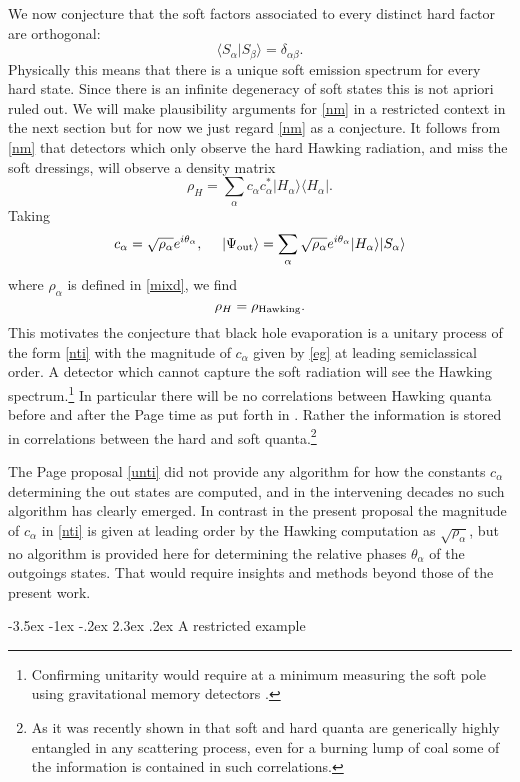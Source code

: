 \documentclass[12pt]{article}
\makeatletter
\numberwithin{equation}{section}
\def\<{\langle }
\def\>{\rangle }
\newcommand{\be}{\begin{equation}}
\newcommand{\ee}{\end{equation}}
\renewcommand\section{\@startsection {section}{1}{\z@}%
                                   {-3.5ex \@plus -1ex \@minus -.2ex}%
                                   {2.3ex \@plus.2ex}%
                                   {\normalfont\large\bfseries}}
\makeatother
\begin{document}
We now conjecture  that the soft factors associated to every distinct hard factor are orthogonal:
\be\label{nm} \<S_\alpha|S_\beta\>=\delta_{\alpha\beta}.\ee
Physically this means that there is a unique soft emission spectrum for every hard state. Since there is an infinite degeneracy of soft states this is not apriori ruled out. We will make plausibility arguments  for \eqref{nm} in a restricted context in the next section but for now we just regard \eqref{nm} as a conjecture. 
It follows from \eqref{nm} that detectors which only observe the hard Hawking radiation, and miss the soft dressings, will observe a density matrix
\be \rho_H =\sum_\alpha c_\alpha  c_\alpha ^*|H_\alpha \>\< H_\alpha  |.\ee
Taking 
\be \label{eg} c_\alpha =\sqrt{\rho_\alpha }e^{i\theta_\alpha }, ~~~~  |\Psi_{\rm out} \> = \sum_\alpha \sqrt{\rho_\alpha }e^{i\theta_\alpha } |H_\alpha\>|S_\alpha\>\ee
where $\rho_\alpha $ is defined  in \eqref{mixd}, we find 
\be \rho_H=\rho_{\rm Hawking}.\ee
This motivates the conjecture that black hole evaporation is a unitary process
of the form \eqref{nti} with the magnitude of $c_\alpha $ given by \eqref{eg} at leading semiclassical order. A detector which cannot capture  the soft radiation will see  the Hawking spectrum.\footnote{Confirming  unitarity would require at a minimum  measuring the  soft pole using  gravitational memory detectors \cite{Strominger:2014pwa}.} In particular there will be no correlations between Hawking quanta 
before and after the Page time as put forth in \cite{Page:1979tc}. Rather the information is stored in correlations between the hard and soft quanta.\footnote{ As it was recently shown in \cite{Carney:2017jut} that soft and hard quanta are generically highly entangled in any  scattering process, even for a  burning lump of coal some of the information is contained in such correlations. }

The Page proposal \eqref{unti} did not provide any algorithm for how the constants 
$c_\alpha$ determining the out states are computed, and in the intervening decades no such algorithm  has clearly emerged. In contrast in the present proposal  the magnitude of $c_\alpha$ in \eqref{nti} is given at leading order by the Hawking computation as $\sqrt{\rho_\alpha}$, but no algorithm is provided here for determining the relative phases $\theta_\alpha $ of the outgoings states. That would require insights and methods beyond those of the present work. 



\section{A restricted example}
\end{document}
